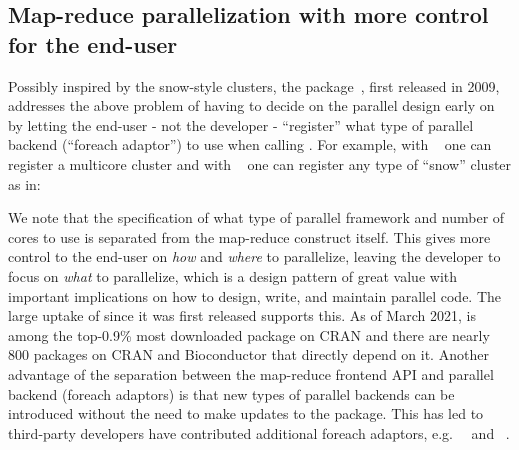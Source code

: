 \subsection{Map-reduce parallelization with more control for the end-user}
\label{map-reduce-parallelization-with-more-control-for-the-end-user}

Possibly inspired by the snow-style clusters, the 
package~\citep{CRAN:foreach,Kane_etal_2013}, first released in 2009,
addresses the above problem of having to decide on the parallel design
early on by letting the end-user - not the developer - ``register''
what type of parallel backend (``foreach adaptor'') to use when
calling . For example, with
~\citep{CRAN:doMC} one can register a multicore cluster and
with ~\citep{CRAN:doParallel} one can register any
type of ``snow'' cluster as in:
%
%
We note that the specification of what type of parallel framework and
number of cores to use is separated from the 
map-reduce construct itself. This gives more control to the end-user
on
\emph{how} and \emph{where} to parallelize, leaving the developer to
focus on \emph{what} to parallelize, which is a design pattern of
great value with important implications on how to design, write, and
maintain parallel code. The large uptake of  since it was
first released supports this. As of March 2021,  is among
the top-0.9\% most downloaded package on CRAN and there are nearly 800
packages on CRAN and Bioconductor that directly depend on it.  Another
advantage of the separation between the map-reduce frontend API and
parallel backend (foreach adaptors) is that new types of parallel
backends can be introduced without the need to make updates to
the  package. This has led to third-party developers have
contributed additional foreach adaptors,
e.g.\ ~\citep{CRAN:doMPI} and
~\citep{CRAN:doRedis}.


